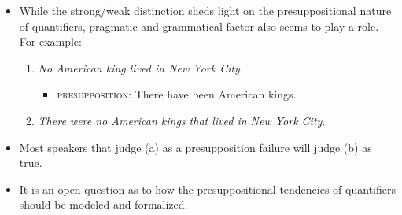 \documentclass[a4paper]{article}
\begin{document}
\begin{itemize}
  \item While the strong/weak distinction sheds light on the presuppositional nature of quantifiers, pragmatic and grammatical factor also seems to play a role. For example:
    \begin{enumerate}
    \item \emph{No American king lived in New York City.}
      \begin{itemize}
        \item \textsc{presupposition:} There have been American kings.
      \end{itemize}
    \item \emph{There were no American kings that lived in New York City.}
    \end{enumerate}
  \item Most speakers that judge (a) as a presupposition failure will judge (b) as true.
  \item It is an open question as to how the presuppositional tendencies of quantifiers should be modeled and formalized.
\end{itemize}
\end{document}
